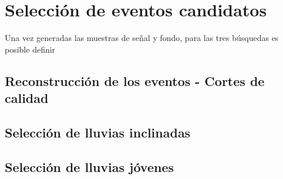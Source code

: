 \chapter{Selecci\'on de eventos candidatos}
\label{ch:selAuger}

Una vez generadas las muestras de señal y fondo, para las tres búsquedas es posible definir 

\section{Reconstrucci\'on de los eventos - Cortes de calidad}

\section{Selecci\'on de lluvias inclinadas}

\section{Selecci\'on de lluvias j\'ovenes}

